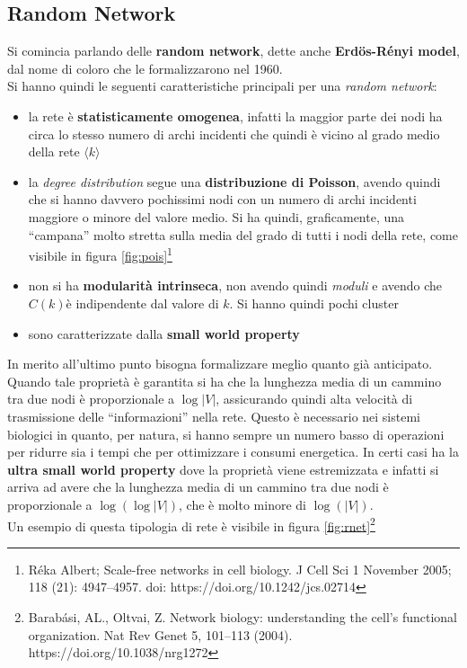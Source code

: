 \documentclass[a4paper,12pt, oneside]{book}
\begin{document}
\subsection{Random Network}
Si comincia parlando delle \textbf{random network}, dette anche
\textbf{Erd\"{o}s-Rényi model}, dal nome di coloro che le formalizzarono nel
1960.\\
Si hanno quindi le seguenti caratteristiche principali per una \textit{random
  network}: 
\begin{itemize}
  \item la rete è \textbf{statisticamente omogenea}, infatti la maggior parte
  dei nodi ha circa lo stesso numero di archi incidenti che quindi è vicino al
  grado medio della rete $\langle k \rangle$
  \item la \textit{degree distribution} segue una \textbf{distribuzione di
    Poisson}, avendo quindi che si hanno davvero pochissimi nodi con un numero
  di archi incidenti maggiore o minore del valore medio. Si ha quindi,
  graficamente, una ``campana'' molto stretta sulla media del grado di tutti i
  nodi della rete,
  come visibile in figura \ref{fig:pois}\footnote{Réka Albert; Scale-free
    networks in cell biology. J Cell Sci 1 November 2005; 118 (21):
    4947–4957. doi: https://doi.org/10.1242/jcs.02714} 
  \item non si ha \textbf{modularità intrinseca}, non avendo quindi
  \textit{moduli} e avendo che $C(k)$è indipendente dal valore di $k$. Si hanno
  quindi pochi cluster
  \item sono caratterizzate dalla \textbf{small world property}
\end{itemize}
In merito all'ultimo punto bisogna formalizzare meglio quanto già
anticipato. Quando tale proprietà è garantita si ha che la lunghezza media di
un cammino tra due nodi è proporzionale a $\log |V|$, assicurando quindi alta
velocità di trasmissione delle ``informazioni'' nella rete. Questo è necessario
nei sistemi biologici in quanto, per natura, si hanno sempre un numero basso di
operazioni per ridurre sia i tempi che per ottimizzare i consumi energetica. In
certi casi ha la \textbf{ultra small world property} dove la proprietà viene
estremizzata e infatti si arriva ad avere che la lunghezza media di
un cammino tra due nodi è proporzionale a $\log(\log |V|)$, che è molto minore
di $\log(|V|)$.\\
Un esempio di questa tipologia di rete è visibile in figura
\ref{fig:rnet}\footnote{Barabási, AL., Oltvai, Z. Network biology: understanding
  the cell's functional organization. Nat Rev Genet 5, 101–113
  (2004). https://doi.org/10.1038/nrg1272} 
\end{document}
